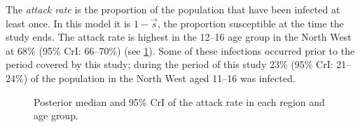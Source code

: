 \documentclass[thesis.tex]{subfiles}
\begin{document}
The \emph{attack rate} is the proportion of the population that have been infected at least once.
In this model it is $1 - \vec{s}$, the proportion susceptible at the time the study ends.
The attack rate is highest in the 12--16 age group in the North West at 68\% (95\% CrI: 66--70\%) (see \cref{SEIR:fig:attack-rates}).
Some of these infections occurred prior to the period covered by this study; during the period of this study 23\% (95\% CrI: 21--24\%) of the population in the North West aged 11--16 was infected.
\begin{figure}
    \caption{Posterior median and 95\% CrI of the attack rate in each region and age group.}
    \label{SEIR:fig:attack-rates}
\end{figure}
\end{document}
